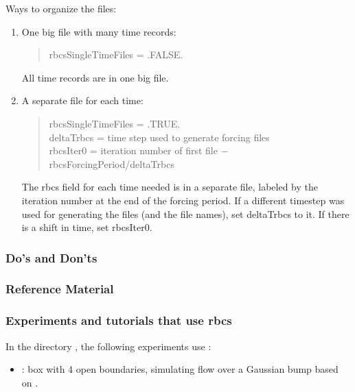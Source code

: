 \noindent
Ways to organize the files:
\begin{enumerate}
\item One big file with many time records:
  \begin{quote}
     rbcsSingleTimeFiles = .FALSE.
  \end{quote}
  All time records are in one big file.

\item A separate file for each time:
  \begin{quote}
     rbcsSingleTimeFiles = .TRUE.\\
     deltaTrbcs = time step used to generate forcing files\\
     rbcsIter0 = iteration number of first file $-$ rbcsForcingPeriod/deltaTrbcs
  \end{quote}
  The rbcs field for each time needed is in a separate file, labeled by the
  iteration number at the end of the forcing period.  If a different timestep
  was used for generating the files (and the file names), set deltaTrbcs to it.
  If there is a shift in time, set rbcsIter0.
\end{enumerate}



\subsubsection{Do's and Don'ts}

\subsubsection{Reference Material}

\subsubsection{Experiments and tutorials that use rbcs}
\label{sec:pkg:rbcs:experiments}

In the directory , the following experiments use
:
\begin{itemize}
\item {}: box with 4 open boundaries, simulating flow over a
  Gaussian bump based on \citet{adcroft:97}.
\end{itemize}




